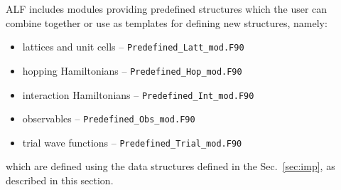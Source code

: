 

\label{Predefined_chap}
ALF includes modules providing predefined structures which the user can combine together or use as templates for defining new structures, namely: 
\begin{itemize}
	\item lattices and unit cells -- \texttt{Predefined\_Latt\_mod.F90}
	\item hopping Hamiltonians -- \texttt{Predefined\_Hop\_mod.F90 }
	\item interaction Hamiltonians -- \texttt{Predefined\_Int\_mod.F90}
	\item observables -- \texttt{Predefined\_Obs\_mod.F90 }
	\item trial wave functions -- \texttt{Predefined\_Trial\_mod.F90 }
\end{itemize}
which are defined using the data structures defined in the Sec.~\ref{sec:imp}, as described in this section.














